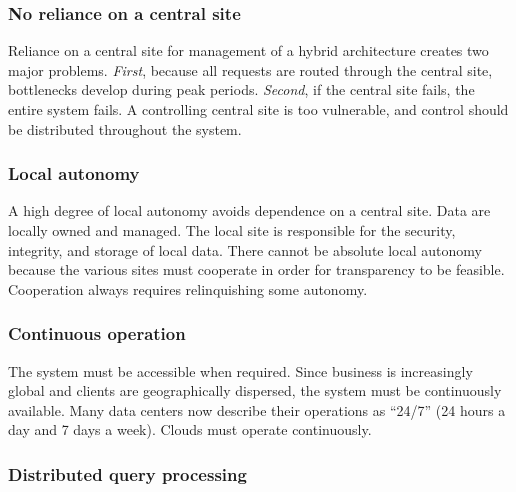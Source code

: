 \documentclass[
]{article}
\begin{document}
\hypertarget{no-reliance-on-a-central-site}{%
\subsubsection*{No reliance on a central site}\label{no-reliance-on-a-central-site}}

Reliance on a central site for management of a hybrid architecture
creates two major problems. \emph{First}, because all requests are routed
through the central site, bottlenecks develop during peak periods.
\emph{Second}, if the central site fails, the entire system fails. A
controlling central site is too vulnerable, and control should be
distributed throughout the system.

\hypertarget{local-autonomy}{%
\subsubsection*{Local autonomy}\label{local-autonomy}}

A high degree of local autonomy avoids dependence on a central site.
Data are locally owned and managed. The local site is responsible for
the security, integrity, and storage of local data. There cannot be
absolute local autonomy because the various sites must cooperate in
order for transparency to be feasible. Cooperation always requires
relinquishing some autonomy.

\hypertarget{continuous-operation}{%
\subsubsection*{Continuous operation}\label{continuous-operation}}

The system must be accessible when required. Since business is
increasingly global and clients are geographically dispersed, the system
must be continuously available. Many data centers now describe their
operations as ``24/7'' (24 hours a day and 7 days a week). Clouds must
operate continuously.

\hypertarget{distributed-query-processing}{%
\subsubsection*{Distributed query processing}\label{distributed-query-processing}}
\end{document}

